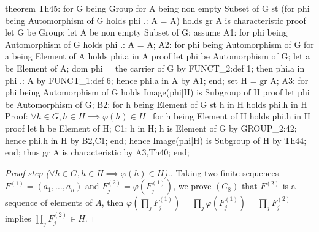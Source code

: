 \nwenddocs{}\endmoddef\nwstartdeflinemarkup{}\nwenddeflinemarkup
theorem Th45:
  for G being Group
  for A being non empty Subset of G
  st (for phi being Automorphism of G
      holds phi .: A = A)
  holds gr A is characteristic
proof
  let G be Group;
  let A be non empty Subset of G;
  assume A1: for phi being Automorphism of G holds phi .: A = A;
  A2: for phi being Automorphism of G for a being Element of A holds phi.a in A
  proof
    let phi be Automorphism of G;
    let a be Element of A;
    dom phi = the carrier of G by FUNCT_2:def 1;
    then phi.a in phi .: A by FUNCT_1:def 6;
    hence phi.a in A by A1;
  end;
  set H = gr A;
  A3: for phi being Automorphism of G holds Image(phi|H) is Subgroup of H
  proof
    let phi be Automorphism of G;
    B2: for h being Element of G st h in H holds phi.h in H
    \LA{}Proof: $\forall h\in G, h\in H\implies \varphi(h)\in H$~{\nwtagstyle{}}\RA{}
    for h being Element of H holds phi.h in H
    proof
      let h be Element of H;
      C1: h in H;
      h is Element of G by GROUP_2:42;
      hence phi.h in H by B2,C1;
    end;
    hence Image(phi|H) is Subgroup of H by Th44;
  end;
  thus gr A is characteristic by A3,Th40;
end;
\eatline
{}\nwendcode{}\nwdocspar
\begin{proof}[Proof step ($\forall h\in G, h\in H\implies \varphi(h)\in H$).]
Taking two finite sequences $F^{(1)}=(a_{1},\dots,a_{n})$ and $F^{(2)}_{j}=\varphi(F^{(1)}_{j})$,
we prove $(C_{8})$ that $F^{(2)}$ is a sequence of elements of $A$, then $\varphi(\prod_{j}F^{(1)}_{j})=\prod_{j}\varphi(F^{(1)}_{j})=\prod_{j}F^{(2)}_{j}$
implies $\prod_{j}F^{(2)}_{j}\in H$.
\end{proof}


